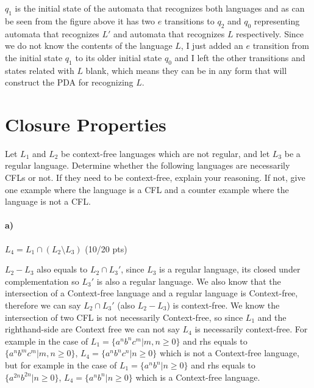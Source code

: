 \documentclass[a4paper,12pt]{article}
\begin{document}
\begin{tcolorbox}
$q_1$ is the initial state of the automata that recognizes both languages and as can be seen from the figure above it has two $e$ transitions to $q_2$ and $q_0$ representing automata that recognizes $L'$ and automata that recognizes $L$ respectively. Since we do not know the contents of the language $L$, I just added an $e$ transition from the initial state $q_1$ to its older initial state $q_0$ and I left the other transitions and states related with $L$ blank, which means they can be in any form that will construct the PDA for recognizing $L$.
\end{tcolorbox}

\newpage
\section{Closure Properties \hfill {}}

Let $L_1$ and $L_2$ be context-free languages which are not regular, and let $L_3$ be a regular language. Determine whether the following languages are necessarily CFLs or not. If they need to be context-free, explain your reasoning. If not, give one example where the language is a CFL and a counter example where the language is not a CFL. \\

\paragraph{a)} $L_4 = L_1 \cap (L_2 \setminus L_3)$ \hfill \small{(10/20 pts)} \\

\begin{tcolorbox}
$L_2-L_3$ also equals to $L_2\cap L_3'$, since $L_3$ is a regular language, its closed under complementation so $L_3'$ is also a regular language. We also know that the intersection of a Context-free language and a regular language is Context-free, therefore we can say $L_2 \cap L_3'$ (also $L_2-L_3$) is context-free. We know the intersection of two CFL is not necessarily Context-free, so since $L_1$ and the righthand-side are Context free we can not say $L_4$ is necessarily context-free. For example in the case of $L_1=\{a^nb^nc^m | m,n \geq 0\}$ and rhs equals to $\{a^nb^mc^m | m,n \geq 0\}$, $L_4 = \{a^nb^nc^n | n \geq 0\}$ which is not a Context-free language, but for example in the case of $L_1=\{a^nb^n | n \geq 0\}$ and rhs equals to $\{a^{2n}b^{2n} | n \geq 0\}$, $L_4 = \{a^nb^n | n \geq 0\}$ which is a Context-free language.
\end{tcolorbox}
\end{document}
